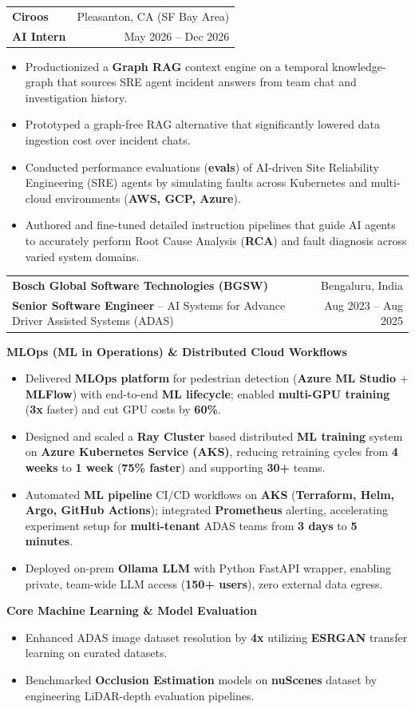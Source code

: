 \documentclass[letterpaper,11pt]{article}
\makeatletter
\newcommand{\resumeItem}[1]{
  \item\small{
    {#1 \vspace{-2pt}}
  }
}
\newcommand{\resumeItemNew}[1]{
  \item\small{
  \hspace{0.9em}\textbf{#1} \vspace{-6.5pt}}
  }
\newcommand{\resumeSubheading}[4]{
  \vspace{-2pt}\item
    \begin{tabular*}{0.97\textwidth}[t]{l@{\extracolsep{\fill}}r}
      \textbf{#1} & #2 \\
      \small#3 & \small #4 \\
    \end{tabular*}\vspace{-7pt}
}
\newcommand{\resumeItemListStart}{\begin{itemize}}
\newcommand{\resumeItemListEnd}{\end{itemize}\vspace{-5pt}}
\makeatother
\begin{document}
  \resumeSubheading
      {Ciroos}{Pleasanton, CA (SF Bay Area)}
      {\textbf{AI Intern}}{May 2026 -- Dec 2026}
      \resumeItemListStart
  \resumeItem{Productionized a \textbf{Graph RAG} context engine on a temporal knowledge-graph that sources SRE agent incident answers from team chat and investigation history.}
  \resumeItem{Prototyped a graph-free RAG alternative that significantly lowered data ingestion cost over incident chats.}
  \resumeItem{Conducted performance evaluations (\textbf{evals}) of AI-driven Site Reliability Engineering (SRE) agents by simulating faults across Kubernetes and multi-cloud environments (\textbf{AWS, GCP, Azure}).}
  \resumeItem{Authored and fine-tuned detailed instruction pipelines that guide AI agents to accurately perform Root Cause Analysis (\textbf{RCA}) and fault diagnosis across varied system domains.}
\resumeItemListEnd

        
  
    \resumeSubheading
      {Bosch Global Software Technologies (BGSW)}{Bengaluru, India}
      {\textbf{Senior Software Engineer} – AI Systems for Advance Driver Assisted Systems (ADAS)}{Aug 2023 -- Aug 2025}
      
      \resumeItemNew{MLOps (ML in Operations) \& Distributed Cloud Workflows}
      \resumeItemListStart
        \resumeItem{Delivered \textbf{MLOps platform} for pedestrian detection (\textbf{Azure ML Studio} + \textbf{MLFlow}) with end-to-end \textbf{ML lifecycle}; enabled \textbf{multi-GPU training} (\textbf{3x} faster) and cut GPU costs by \textbf{60\%}.}
        
        \resumeItem{Designed and scaled a \textbf{Ray Cluster} based distributed \textbf{ML training} system on \textbf{Azure Kubernetes Service (AKS)}, reducing retraining cycles from \textbf{4 weeks} to \textbf{1 week} (\textbf{75\% faster}) and supporting \textbf{30+} teams.}

        \resumeItem{Automated \textbf{ML pipeline} CI/CD workflows on \textbf{AKS} (\textbf{Terraform, Helm, Argo, GitHub Actions}); integrated \textbf{Prometheus} alerting, accelerating experiment setup for \textbf{multi-tenant} ADAS teams from \textbf{3 days} to \textbf{5 minutes}.}
        
        \resumeItem{Deployed on-prem \textbf{Ollama LLM} with Python FastAPI wrapper, enabling private, team-wide LLM access (\textbf{150+ users}), zero external data egress.}
      \resumeItemListEnd

      \resumeItemNew{Core Machine Learning \& Model Evaluation}
      \resumeItemListStart
        \resumeItem{Enhanced ADAS image dataset resolution by \textbf{4x} utilizing \textbf{ESRGAN} transfer learning on curated datasets.}
        \resumeItem{Benchmarked \textbf{Occlusion Estimation} models on \textbf{nuScenes} dataset by engineering LiDAR-depth evaluation pipelines.}
      \resumeItemListEnd
\end{document}
